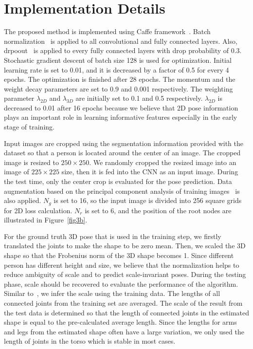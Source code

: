 \documentclass[runningheads]{llncs}
\begin{document}
\section{Implementation Details}
\label{sec:detail}
The proposed method is implemented using Caffe framework~\cite{jia2014caffe}. Batch normalization~\cite{ioffe2015batch} is applied to all convolutional and fully connected layers. Also, drpoout~\cite{srivastava2014dropout} is applied to every fully connected layers with drop probability of 0.3. Stochastic gradient descent of batch size 128 is used for optimization. Initial learning rate is set to 0.01, and it is decreased by a factor of 0.5 for every 4 epochs. The optimization is finished after 28 epochs. The momentum and the weight decay parameters are set to 0.9 and 0.001 respectively. The weighting parameter $\lambda_{2D}$ and $\lambda_{3D}$ are initially set to 0.1 and 0.5 respectively. $\lambda_{2D}$ is decreased to 0.01 after 16 epochs because we believe that 2D pose information plays an important role in learning informative features especially in the early stage of training.

Input images are cropped using the segmentation information provided with the dataset so that a person is located around the center of an image. The cropped image is resized to $250\times250$. We randomly cropped the resized image into an image of $225\times225$ size, then it is fed into the CNN as an input image. During the test time, only the center crop is evaluated for the pose prediction. Data augmentation based on the principal component analysis of training images~\cite{krizhevsky2012imagenet} is also applied. $N_g$ is set to 16, so the input image is divided into 256 square grids for 2D loss calculation. $N_r$ is set to 6, and the position of the root nodes are illustrated in Figure~\ref{fig3b}.

For the ground truth 3D pose that is used in the training step, we firstly translated the joints to make the shape to be zero mean. Then, we scaled the 3D shape so that the Frobenius norm of the 3D shape becomes 1. Since different person has different height and size, we believe that the normalization helps to reduce ambiguity of scale and to predict scale-invariant poses. During the testing phase, scale should be recovered to evaluate the performance of the algorithm. Similar to~\cite{Zhou_2016_CVPR}, we infer the scale using the training data. The lengths of all connected joints from the training set are averaged. The scale of the result from the test data is determined so that the length of connected joints in the estimated shape is equal to the pre-calculated average length. Since the lengths for arms and legs from the estimated shape often have a large variation, we only used the length of joints in the torso which is stable in most cases.
\end{document}
